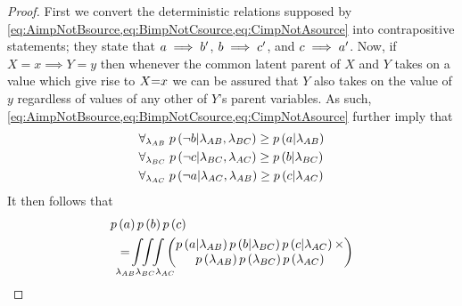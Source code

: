 \begin{proof}
First we convert the deterministic relations supposed by \cref{eq:AimpNotBsource,eq:BimpNotCsource,eq:CimpNotAsource} into contrapositive statements; they state that $a\implies b^{\prime}$, $b\implies c^{\prime}$, and $c\implies a^{\prime}$. Now, if $X\mathopen{=}x\implies Y\mathopen{=}y$ then whenever the common latent parent of $X$ and $Y$ takes on a value which give rise to $X\mathord{=}x$ we can be assured that $Y$ also takes on the value of $y$ regardless of values of any other of $Y$'s parent variables. As such, \cref{eq:AimpNotBsource,eq:BimpNotCsource,eq:CimpNotAsource} further imply that
\begin{align}
&\forall_{\lambda_{AB} }\; p\left(\lnot b|\lambda_{AB},\lambda_{BC}\right)\geq p\left(a|\lambda_{AB}\right)\\
&\forall_{\lambda_{BC} }\; p\left(\lnot c|\lambda_{BC},\lambda_{AC}\right)\geq p\left(b|\lambda_{BC}\right)\\
&\forall_{\lambda_{AC} }\; p\left(\lnot a|\lambda_{AC},\lambda_{AB}\right)\geq p\left(c|\lambda_{AC}\right)
\end{align}
It then follows that
\begin{align}
\nonumber p&\left(a\right)p\left(b\right)p\left(c\right)
\\ &=\!\int\!\!\int\limits_{\mathclap{\lambda_{AB}\lambda_{BC}\lambda_{AC}}}\!\!\int
\begin{pmatrix}p\left(a|\lambda_{AB}\right) p\left(b|\lambda_{BC}\right)p\left(c|\lambda_{AC}\right)\times\\ p\left(\lambda_{AB}\right)p\left(\lambda_{BC}\right) p\left(\lambda_{AC}\right)\end{pmatrix}

\end{align}
\end{proof}
